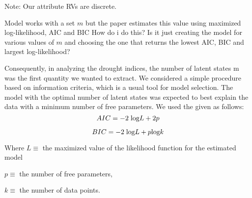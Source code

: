 Note: Our attribute RVs are discrete. 

Model works with a set $m$ but the paper estimates this value using maximized log-likelihood, AIC and BIC
How do i do this? Is it just creating the model for various values of $m$ and choosing the one that returns the lowest AIC, BIC and largest log-likelihood?




 Consequently, in analyzing the drought indices, the number of latent states m was the first quantity we wanted to extract. We considered a simple procedure based on information criteria, which is a usual tool for model selection. The model with the optimal number of latent states was expected to best explain the data with a minimum number of free parameters. We used the  given as follows:
\[
    AIC = -2 \hspace{0.1cm} \text{log} L + 2p
\]

\[
    BIC = -2 \hspace{0.1cm}\text{log}L + p \text{log} k
\]

Where $L \equiv$ the maximized value of the likelihood function for the estimated model

$p \equiv$ the number of free parameters, 

$k \equiv$ the number of data points. 



